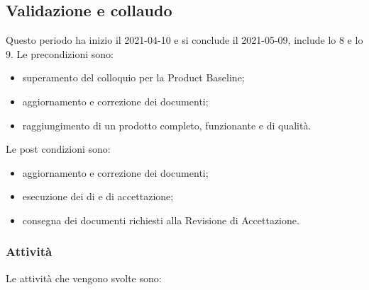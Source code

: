 \newpage
\subsection{Validazione e collaudo}
Questo periodo ha inizio il 2021-04-10 e si conclude il 2021-05-09, include lo  8 e lo  9.
Le precondizioni sono:
\begin{itemize}
	\item superamento del colloquio per la Product Baseline;
	\item aggiornamento e correzione dei documenti;
	\item raggiungimento di un prodotto completo, funzionante e di qualità.
\end{itemize}
Le post condizioni sono:
\begin{itemize}
	\item aggiornamento e correzione dei documenti;
	\item esecuzione dei  di  e di accettazione;
	\item consegna dei documenti richiesti alla Revisione di Accettazione.
\end{itemize}
\subsubsection{Attività}
Le attività che vengono svolte sono:
